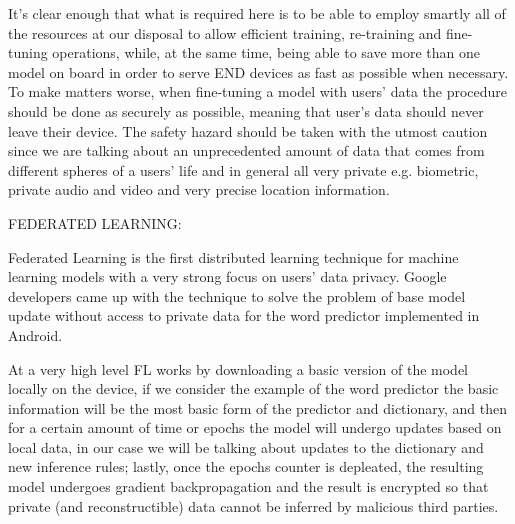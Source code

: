 It's clear enough that what is required here is to be able to employ smartly all of the resources at
our disposal to allow efficient training, re-training and fine-tuning operations, while, at the same
time, being able to save more than one model on board in order to serve END devices as fast as possible when necessary. To make matters worse, when fine-tuning a model with users' data the procedure should be done as
securely as possible, meaning that user's data should never leave their device.
The safety hazard should be taken with the utmost caution since we are talking about an
unprecedented amount of data that comes from different spheres of a users' life and in general all
very private e.g. biometric, private audio and video and very precise location information.

\bigskip
\noindent
FEDERATED LEARNING:

Federated Learning is the first distributed learning technique for machine learning models with a
very strong focus on users' data privacy. Google developers came up with the technique to solve the
problem of base model update without access to private data for the word predictor implemented in
Android.

At a very high level FL works by downloading a basic version of the model locally on the device, if
we consider the example of the word predictor the basic information will be the most basic form of
the predictor and dictionary, and then for a certain amount of time or epochs the model will undergo
updates based on local data, in our case we will be talking about updates to the dictionary and new
inference rules; lastly, once the epochs counter is depleated, the resulting model undergoes
gradient backpropagation and the result is encrypted so that private (and reconstructible) data
cannot be inferred by malicious third parties.

